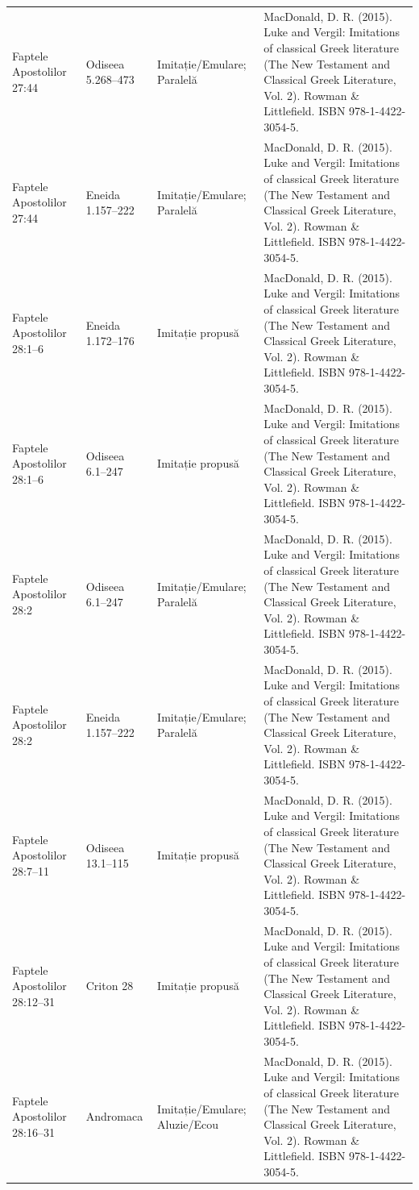 \documentclass[12pt,a4paper,twoside,openany]{book}
\begin{document}
\begin{longtable}{L{1.4cm}L{1.7cm}L{3.1cm}L{8.4cm}}
Faptele Apostolilor 27:44 & Odiseea 5.268–473 & Imitație/Emulare; Paralelă & MacDonald, D. R. (2015). Luke and Vergil: Imitations of classical Greek literature (The New Testament and Classical Greek Literature, Vol. 2). Rowman \& Littlefield. ISBN 978-1-4422-3054-5. \\
Faptele Apostolilor 27:44 & Eneida 1.157–222 & Imitație/Emulare; Paralelă & MacDonald, D. R. (2015). Luke and Vergil: Imitations of classical Greek literature (The New Testament and Classical Greek Literature, Vol. 2). Rowman \& Littlefield. ISBN 978-1-4422-3054-5. \\
Faptele Apostolilor 28:1–6 & Eneida 1.172–176 & Imitație propusă & MacDonald, D. R. (2015). Luke and Vergil: Imitations of classical Greek literature (The New Testament and Classical Greek Literature, Vol. 2). Rowman \& Littlefield. ISBN 978-1-4422-3054-5. \\
Faptele Apostolilor 28:1–6 & Odiseea 6.1–247 & Imitație propusă & MacDonald, D. R. (2015). Luke and Vergil: Imitations of classical Greek literature (The New Testament and Classical Greek Literature, Vol. 2). Rowman \& Littlefield. ISBN 978-1-4422-3054-5. \\
Faptele Apostolilor 28:2 & Odiseea 6.1–247 & Imitație/Emulare; Paralelă & MacDonald, D. R. (2015). Luke and Vergil: Imitations of classical Greek literature (The New Testament and Classical Greek Literature, Vol. 2). Rowman \& Littlefield. ISBN 978-1-4422-3054-5. \\
Faptele Apostolilor 28:2 & Eneida 1.157–222 & Imitație/Emulare; Paralelă & MacDonald, D. R. (2015). Luke and Vergil: Imitations of classical Greek literature (The New Testament and Classical Greek Literature, Vol. 2). Rowman \& Littlefield. ISBN 978-1-4422-3054-5. \\
Faptele Apostolilor 28:7–11 & Odiseea 13.1–115 & Imitație propusă & MacDonald, D. R. (2015). Luke and Vergil: Imitations of classical Greek literature (The New Testament and Classical Greek Literature, Vol. 2). Rowman \& Littlefield. ISBN 978-1-4422-3054-5. \\
Faptele Apostolilor 28:12–31 & Criton 28 & Imitație propusă & MacDonald, D. R. (2015). Luke and Vergil: Imitations of classical Greek literature (The New Testament and Classical Greek Literature, Vol. 2). Rowman \& Littlefield. ISBN 978-1-4422-3054-5. \\
Faptele Apostolilor 28:16–31 & Andromaca & Imitație/Emulare; Aluzie/Ecou & MacDonald, D. R. (2015). Luke and Vergil: Imitations of classical Greek literature (The New Testament and Classical Greek Literature, Vol. 2). Rowman \& Littlefield. ISBN 978-1-4422-3054-5. \\

\end{longtable}
\end{document}
